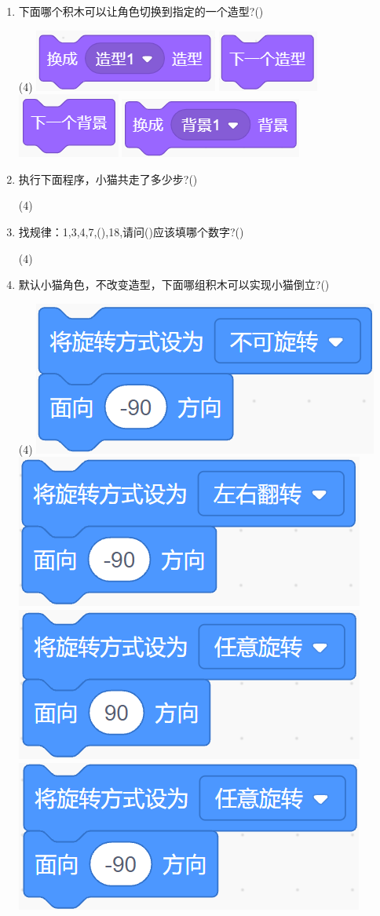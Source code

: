 \documentclass[10pt, a4paper]{article}
\begin{document}
\begin{enumerate}
        \item 下面哪个积木可以让角色切换到指定的一个造型?(\qquad)
        \begin{tasks}(4)
            \task \includegraphics[width=.13\textwidth]{18a.png}
            \task \includegraphics[width=.08\textwidth]{18b.png}
            \task \includegraphics[width=.08\textwidth]{18c.png}
            \task \includegraphics[width=.13\textwidth]{18d.png}
        \end{tasks}

        \item 执行下面程序，小猫共走了多少步?(\qquad)
        \begin{tasks}(4)
        \end{tasks}

        \item 找规律：1,3,4,7,(\quad),18,请问()应该填哪个数字?(\qquad)
        \begin{tasks}(4)
        \end{tasks}

        \item 默认小猫角色，不改变造型，下面哪组积木可以实现小猫倒立?(\qquad)
        \begin{tasks}(4)
            \task \includegraphics[width=.15\textwidth]{21a.png}
            \task \includegraphics[width=.15\textwidth]{21b.png}
            \task \includegraphics[width=.15\textwidth]{21c.png}
            \task \includegraphics[width=.15\textwidth]{21d.png}
        \end{tasks}


\end{enumerate}
\end{document}
